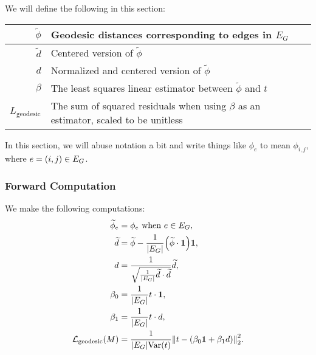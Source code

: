 We will define the following in this section: \begin{center}\begin{tabular}{r|l}
	\(\widetilde{\phi}\) & Geodesic distances corresponding to edges in \(E_G\) \\ \hline
	\(\widetilde{d}\) & Centered version of \(\widetilde{\phi}\) \\ \hline
	\(d\) & Normalized and centered version of \(\widetilde{\phi}\) \\ \hline
	\(\beta\) & The least squares linear estimator between \(\widetilde{\phi}\) and \(t\) \\ \hline
	\(L_{\mathrm{geodesic}}\) & The sum of squared residuals when using \(\beta\) as an estimator, scaled to be unitless
\end{tabular}\end{center} In this section, we will abuse notation a bit and write things like \(\phi_e\) to mean \(\phi_{i, j}\), where \(e = \pof{i, j} \in E_G\).

\subsubsection{Forward Computation}
We make the following computations: \begin{align*}
	\widetilde{\phi}_e &= \phi_e \text{ when \(e \in E_G\)}, \\
	\widetilde{d} &= \widetilde{\phi} - \frac{1}{\abs{E_G}}\pof{\widetilde{\phi} \cdot \mathbf{1}}\mathbf{1}, \\
	d &= \frac{1}{\sqrt{\frac{1}{\abs{E_G}}\widetilde{d} \cdot \widetilde{d}}}\widetilde{d}, \\
	\beta_0 &= \frac{1}{\abs{E_G}}t \cdot \mathbf{1}, \\
	\beta_1 &= \frac{1}{\abs{E_G}}t \cdot d, \\
	\mathcal{L}_{\mathrm{geodesic}}\pof{M} &= \frac{1}{\abs{E_G}\Var\pof{t}}\norm{t - \pof{\beta_0\mathbf{1} + \beta_1d}}_2^2. \\
\end{align*}

